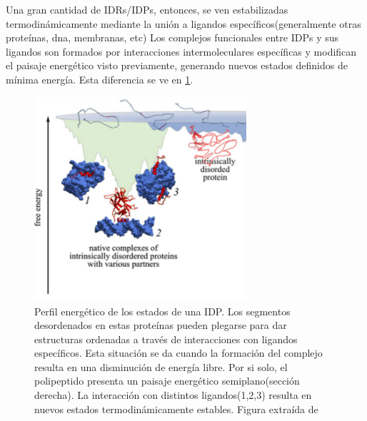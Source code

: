 Una gran cantidad de IDRs/IDPs, entonces, se ven estabilizadas termodinámicamente mediante la unión a ligandos específicos(generalmente otras proteínas, dna, membranas, etc)
Los complejos funcionales entre IDPs y sus ligandos son formados por interacciones intermoleculares específicas y modifican el paisaje energético visto previamente, generando nuevos estados definidos de mínima energía.
Esta diferencia se ve en \ref{idpBindingEnLandscape}.


\begin{figure}[h]
\centering
\includegraphics[width=0.7\textwidth]{img/idp-binding-EnLandscape.png} 
\caption{Perfil energético de los estados de una IDP. Los segmentos desordenados en estas proteínas pueden plegarse para dar estructuras ordenadas a través de interacciones con ligandos específicos.
Esta situación se da cuando la formación del complejo resulta en una disminución de energía libre. 
Por si solo, el polipeptido presenta un paisaje energético semiplano(sección derecha). La interacción con distintos ligandos(1,2,3) resulta en nuevos estados termodinámicamente estables.
Figura extraída de \cite{turoverov2010protein}}
\label{idpBindingEnLandscape}
\end{figure}

